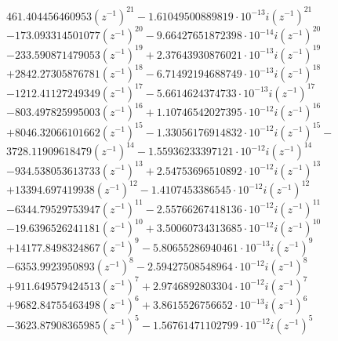 \documentclass{scrartcl}
\begin{document}
\begin{center}

    $461.404456460953 \left(z^{-1}\right)^{21} - 1.61049500889819 \cdot 10^{-13} i \left(z^{-1}\right)^{21}$ \\ 
    $ - 173.093314501077 \left(z^{-1}\right)^{20} - 9.66427651872398 \cdot 10^{-14} i \left(z^{-1}\right)^{20}$ \\ 
    $ - 233.590871479053 \left(z^{-1}\right)^{19} + 2.37643930876021 \cdot 10^{-13} i \left(z^{-1}\right)^{19}$ \\ 
    $ + 2842.27305876781 \left(z^{-1}\right)^{18} - 6.71492194688749 \cdot 10^{-13} i \left(z^{-1}\right)^{18}$ \\ 
    $ - 1212.41127249349 \left(z^{-1}\right)^{17} - 5.6614624374733 \cdot 10^{-13} i \left(z^{-1}\right)^{17}$ \\ 
    $ - 803.497825995003 \left(z^{-1}\right)^{16} + 1.10746542027395 \cdot 10^{-12} i \left(z^{-1}\right)^{16}$ \\ 
    $ + 8046.32066101662 \left(z^{-1}\right)^{15} - 1.33056176914832 \cdot 10^{-12} i \left(z^{-1}\right)^{15} - $ \\ 
    $3728.11909618479 \left(z^{-1}\right)^{14} - 1.55936233397121 \cdot 10^{-12} i \left(z^{-1}\right)^{14}$ \\ 
    $ - 934.538053613733 \left(z^{-1}\right)^{13} + 2.54753696510892 \cdot 10^{-12} i \left(z^{-1}\right)^{13}$ \\ 
    $ + 13394.697419938 \left(z^{-1}\right)^{12} - 1.4107453386545 \cdot 10^{-12} i \left(z^{-1}\right)^{12}$ \\ 
    $ - 6344.79529753947 \left(z^{-1}\right)^{11} - 2.55766267418136 \cdot 10^{-12} i \left(z^{-1}\right)^{11}$ \\ 
    $ - 19.6396526241181 \left(z^{-1}\right)^{10} + 3.50060734313685 \cdot 10^{-12} i \left(z^{-1}\right)^{10}$ \\ 
    $ + 14177.8498324867 \left(z^{-1}\right)^{9} - 5.80655286940461 \cdot 10^{-13} i \left(z^{-1}\right)^{9}$ \\ 
    $ - 6353.9923950893 \left(z^{-1}\right)^{8} - 2.59427508548964 \cdot 10^{-12} i \left(z^{-1}\right)^{8}$ \\ 
    $ + 911.649579424513 \left(z^{-1}\right)^{7} + 2.9746892803304 \cdot 10^{-12} i \left(z^{-1}\right)^{7}$ \\ 
    $ + 9682.84755463498 \left(z^{-1}\right)^{6} + 3.8615526756652 \cdot 10^{-13} i \left(z^{-1}\right)^{6}$ \\ 
    $ - 3623.87908365985 \left(z^{-1}\right)^{5} - 1.56761471102799 \cdot 10^{-12} i \left(z^{-1}\right)^{5}$ \\ 

\end{center}
\end{document}
